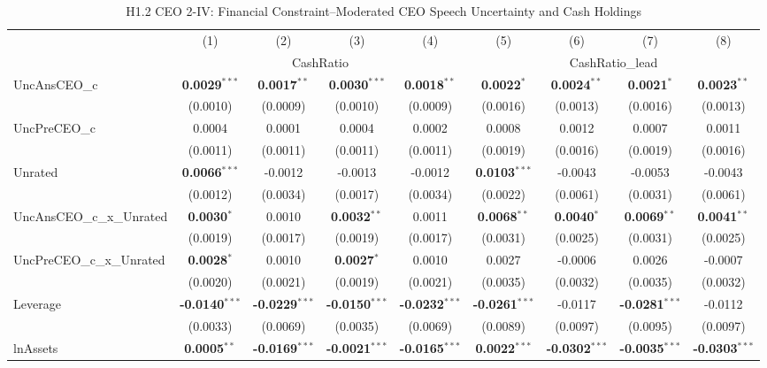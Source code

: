 \documentclass[11pt,a4paper]{article}
\begin{document}
\begin{table}[htbp]
\centering
\caption{H1.2 CEO 2-IV: Financial Constraint--Moderated CEO Speech Uncertainty and Cash Holdings}
\label{tab:h1_2_ceo2}
\scriptsize
\begin{tabular}{lcccccccc}
\toprule
 & (1) & (2) & (3) & (4) & (5) & (6) & (7) & (8) \\
 & \multicolumn{4}{c}{CashRatio} & \multicolumn{4}{c}{CashRatio\_lead} \\
\cmidrule(lr){2-5} \cmidrule(lr){6-9}
\midrule
UncAnsCEO\_c & \textbf{0.0029}$^{***}$ & \textbf{0.0017}$^{**}$ & \textbf{0.0030}$^{***}$ & \textbf{0.0018}$^{**}$ & \textbf{0.0022}$^{*}$ & \textbf{0.0024}$^{**}$ & \textbf{0.0021}$^{*}$ & \textbf{0.0023}$^{**}$ \\
 & (0.0010) & (0.0009) & (0.0010) & (0.0009) & (0.0016) & (0.0013) & (0.0016) & (0.0013) \\
UncPreCEO\_c & 0.0004 & 0.0001 & 0.0004 & 0.0002 & 0.0008 & 0.0012 & 0.0007 & 0.0011 \\
 & (0.0011) & (0.0011) & (0.0011) & (0.0011) & (0.0019) & (0.0016) & (0.0019) & (0.0016) \\
Unrated & \textbf{0.0066}$^{***}$ & -0.0012 & -0.0013 & -0.0012 & \textbf{0.0103}$^{***}$ & -0.0043 & -0.0053 & -0.0043 \\
 & (0.0012) & (0.0034) & (0.0017) & (0.0034) & (0.0022) & (0.0061) & (0.0031) & (0.0061) \\
UncAnsCEO\_c\_x\_Unrated & \textbf{0.0030}$^{*}$ & 0.0010 & \textbf{0.0032}$^{**}$ & 0.0011 & \textbf{0.0068}$^{**}$ & \textbf{0.0040}$^{*}$ & \textbf{0.0069}$^{**}$ & \textbf{0.0041}$^{**}$ \\
 & (0.0019) & (0.0017) & (0.0019) & (0.0017) & (0.0031) & (0.0025) & (0.0031) & (0.0025) \\
UncPreCEO\_c\_x\_Unrated & \textbf{0.0028}$^{*}$ & 0.0010 & \textbf{0.0027}$^{*}$ & 0.0010 & 0.0027 & -0.0006 & 0.0026 & -0.0007 \\
 & (0.0020) & (0.0021) & (0.0019) & (0.0021) & (0.0035) & (0.0032) & (0.0035) & (0.0032) \\
\midrule
Leverage & \textbf{-0.0140}$^{***}$ & \textbf{-0.0229}$^{***}$ & \textbf{-0.0150}$^{***}$ & \textbf{-0.0232}$^{***}$ & \textbf{-0.0261}$^{***}$ & -0.0117 & \textbf{-0.0281}$^{***}$ & -0.0112 \\
 & (0.0033) & (0.0069) & (0.0035) & (0.0069) & (0.0089) & (0.0097) & (0.0095) & (0.0097) \\
lnAssets & \textbf{0.0005}$^{**}$ & \textbf{-0.0169}$^{***}$ & \textbf{-0.0021}$^{***}$ & \textbf{-0.0165}$^{***}$ & \textbf{0.0022}$^{***}$ & \textbf{-0.0302}$^{***}$ & \textbf{-0.0035}$^{***}$ & \textbf{-0.0303}$^{***}$ \\

\end{tabular}
\end{table}
\end{document}
